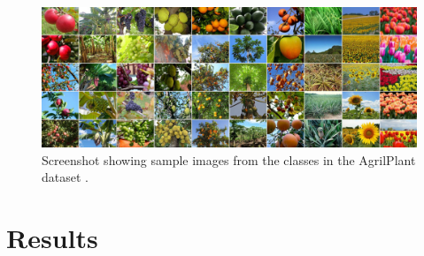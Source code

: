 \documentclass[conference]{IEEEtran}
\begin{document}
    \begin{figure}
    
        \centerline{\includegraphics[width=1\textwidth]{figures/agrilplant-image.jpeg}}
        \caption{Screenshot showing sample images from the classes in the AgrilPlant dataset \cite{pawara2017comparing}.}

        \label{fig:agrilplant}
    \end{figure}
    
        

\section{Results}
\end{document}
